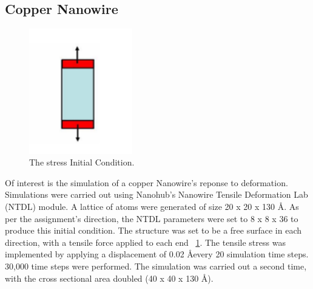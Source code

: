 \documentclass[11pt,twocolumn]{report}
\begin{document}
        \subsection{Copper Nanowire}
        \begin{figure}[!htb]
            \label{fig:applied-stress-partA}
            \centering
            \includegraphics[width=0.4\textwidth]{applied-stress-partA.png}
            \caption{The stress Initial Condition.}
        \end{figure}
        Of interest is the simulation of a copper Nanowire's reponse to deformation.  Simulations were carried out using Nanohub's Nanowire Tensile Deformation Lab (NTDL) module.  A lattice of atoms were generated of size 20 x 20 x 130 \AA. As per the assignment's direction, the NTDL parameters were set to 8 x 8 x 36 to produce this initial condition.  The structure was set to be a free surface in each direction, with a tensile force applied to each end ~\ref{fig:applied-stress-partA}.  The tensile stress was implemented by applying a displacement of 0.02 \AA  every 20 simulation time steps. 30,000 time steps were performed.  The simulation was carried out a second time, with the cross sectional area doubled (40 x 40 x 130 \AA).
\end{document}
